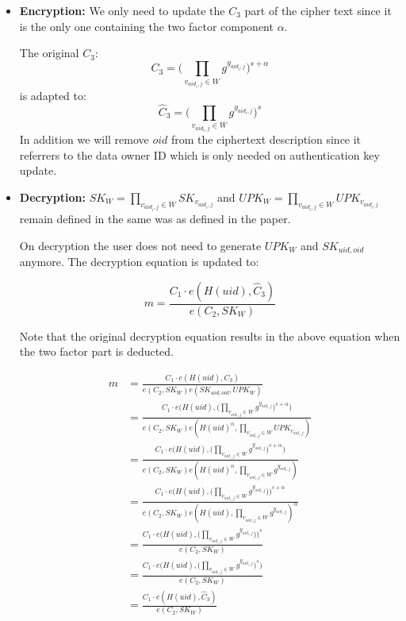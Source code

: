 \begin{itemize}
\item \textbf{Encryption:} 
We only need to update the $C_3$ part of the cipher text since it is the only one containing the two factor component $\alpha$.

The original $C_3$:
$$
C_3 = \Big( \prod_{v_{aid_{i}, j}\in W} g^{y_{aid_{i}, j}} \Big)^{s + \alpha} 
$$
is adapted to:
$$
\widehat{C}_3 = \Big( \prod_{v_{aid_{i}, j}\in W} g^{y_{aid_{i}, j}} \Big)^s
$$ 
In addition we will remove $oid$ from the ciphertext description since it referrers to the data owner ID which is only needed on authentication key update.

\item \textbf{Decryption:}
$SK_W = \prod_{v_{aid_i,j} \in W} SK_{v_{aid_i,j}}$ and $UPK_W = \prod_{v_{aid_i,j} \in W} UPK_{v_{aid_i,j}}$ remain defined in the same was as defined in the paper. 

On decryption the user does not need to generate $UPK_W$ and $SK_{uid, oid}$ anymore. The decryption equation is updated to:

$$
m = \frac{C_1 \cdotp e(H(uid), \widehat{C}_3)}{e(C_2, SK_W)}
$$

Note that the original decryption equation results in the above equation when the two factor part is deducted.

\begin{equation}
\begin{split}
m &= \frac{C_1 \cdotp e(H(uid), C_3)}{e(C_2, SK_W)e(SK_{uid, oid}, UPK_W)} \\
  &= \frac{C_1 \cdotp e\Big(H(uid), \Big( \prod_{v_{aid_{i}, j}\in W} g^{y_{aid_{i}, j}} \Big)^{s + \alpha} \Big)}{e(C_2, SK_W)e(H(uid)^\alpha, \prod_{v_{aid_i,j} \in W} UPK_{v_{aid_i,j}})} \\
  &= \frac{C_1 \cdotp e\Big(H(uid), \Big( \prod_{v_{aid_{i}, j}\in W} g^{y_{aid_{i}, j}} \Big)^{s + \alpha} \Big)}{e(C_2, SK_W)e(H(uid)^\alpha, \prod_{v_{aid_i,j} \in W} g^{y_{aid_i,j}})} \\
  &= \frac{C_1 \cdotp e\Big(H(uid), \Big( \prod_{v_{aid_{i}, j}\in W} g^{y_{aid_{i}, j}} \Big) \Big)^{s + \alpha}}{e(C_2, SK_W)e(H(uid), \prod_{v_{aid_i,j} \in W} g^{y_{aid_i,j}})^\alpha} \\
  &= \frac{C_1 \cdotp e\Big(H(uid), \Big( \prod_{v_{aid_{i}, j}\in W} g^{y_{aid_{i}, j}} \Big) \Big)^{s}}{e(C_2, SK_W)} \\
  &= \frac{C_1 \cdotp e\Big(H(uid), \Big( \prod_{v_{aid_{i}, j}\in W} g^{y_{aid_{i}, j}} \Big)^{s} \Big)}{e(C_2, SK_W)} \\
  &= \frac{C_1 \cdotp e(H(uid), \widehat{C}_3)}{e(C_2, SK_W)}
\end{split}
\label{eq:2faRemoval}
\end{equation}


\end{itemize}
